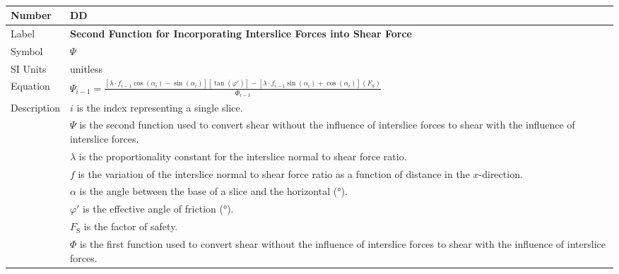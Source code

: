 \documentclass[12pt]{article}
\newcommand{\colAwidth}{0.13\textwidth}
\newcommand{\colBwidth}{0.82\textwidth}
\renewcommand{\arraystretch}{1}
\newcounter{datadefnum} %
\newcounter{defnum} %
\begin{document}

~\newline


\noindent
\begin{minipage}{\textwidth}
	\renewcommand*{\arraystretch}{1.6}
	\begin{tabular}{| p{\colAwidth} | p{\colBwidth} |}
		
		\hline \rowcolor[gray]{0.9} Number&
		DD{datadefnum}\thedatadefnum \label{DD_Psi}\\
		
		\hline Label& \bf Second Function for Incorporating Interslice Forces 
		into Shear Force\\
		\hline Symbol& $\Psi$\\
		\hline SI Units& unitless\\
		
		\hline
		Equation & 
		$\Psi_{i-1} = \frac{\left[ \lambda \cdot f_{i-1}
		\cos\left(\alpha_{i}\right) -
		\sin\left(\alpha_{i}\right) \right]\left[
		\tan\left(\varphi'\right) \right] - \left[ \lambda \cdot
		f_{i-1} \sin\left(\alpha_{i}\right) +
		\cos\left(\alpha_{i}\right) \right] \left( F_\text{S}
		\right)}{\Phi_{i-1}}$\\
		
		\hline Description &$i$ is the index representing a single slice.\\
		&$\Psi$ is the second function used to convert shear without the 
		influence of interslice forces to shear with the influence of 
		interslice forces.\\
		&$\lambda$ is the proportionality constant for the interslice normal to 
		shear force ratio.\\
		&$f$ is the variation of the interslice normal to shear force ratio as 
		a function of distance in the $x$-direction.\\
		&$\alpha$ is the angle between the base of a slice and the horizontal 
		(\si{\degree}).\\
		&$\varphi'$ is the effective angle of friction (\si{\degree}).\\
		&$F_\text{S}$ is the factor of safety.\\
		&$\Phi$ is the first function used to convert shear without the 
		influence of interslice forces to shear with the influence of 
		interslice forces.\\
		

\end{tabular}
\end{minipage}
\end{document}
